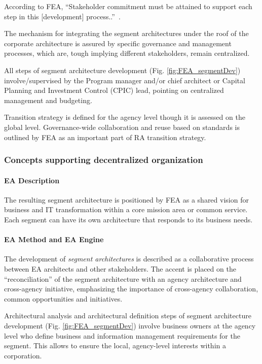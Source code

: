 According to FEA, ``Stakeholder commitment must be attained to support each step in this [development] process..''~\cite{FEA_PMO2007}.
 
The mechanism for integrating the segment architectures under the roof of the corporate architecture is  assured by specific governance and management processes, which are, tough implying different stakeholders, remain centralized. 

All steps of segment architecture development (Fig. \ref{fig:FEA_segmentDev}) involve/supervised by the Program manager and/or chief architect or Capital Planning and Investment Control (CPIC) lead, pointing on centralized management and budgeting.

Transition strategy is defined for the agency level though it is assessed on the global level. Governance-wide collaboration and reuse based on standards is outlined by FEA as an important part of RA transition strategy.

\subsubsection{Concepts supporting decentralized organization}
\paragraph*{EA Description}

The resulting segment architecture is positioned by FEA as a shared vision for business and IT transformation within a core mission area or common service. Each segment can have its own architecture that responds to its business needs.

\paragraph*{EA Method and EA Engine}

The development of \textit{segment architectures} is described as a collaborative process between EA architects and other stakeholders. The accent is placed on the ``reconciliation'' of the segment architecture with an agency architecture and cross-agency initiative, emphasizing the importance of  cross-agency collaboration, common opportunities and initiatives.

Architectural analysis and architectural definition steps of segment architecture development (Fig. \ref{fig:FEA_segmentDev}) involve business owners at the agency level who define business and information management requirements for the segment. This allows to ensure the local, agency-level interests within a corporation. 

